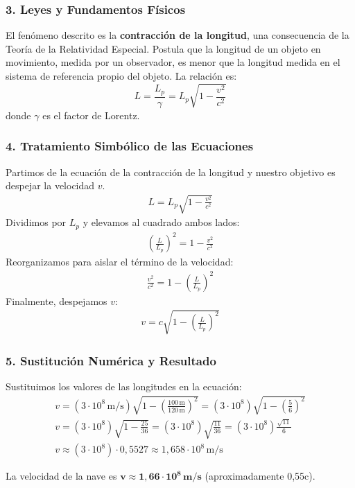 \subsubsection*{3. Leyes y Fundamentos Físicos}
El fenómeno descrito es la \textbf{contracción de la longitud}, una consecuencia de la Teoría de la Relatividad Especial. Postula que la longitud de un objeto en movimiento, medida por un observador, es menor que la longitud medida en el sistema de referencia propio del objeto. La relación es:
$$ L = \frac{L_p}{\gamma} = L_p \sqrt{1 - \frac{v^2}{c^2}} $$
donde $\gamma$ es el factor de Lorentz.

\subsubsection*{4. Tratamiento Simbólico de las Ecuaciones}
Partimos de la ecuación de la contracción de la longitud y nuestro objetivo es despejar la velocidad $v$.
\begin{gather}
    L = L_p \sqrt{1 - \frac{v^2}{c^2}}
\end{gather}
Dividimos por $L_p$ y elevamos al cuadrado ambos lados:
\begin{gather}
    \left(\frac{L}{L_p}\right)^2 = 1 - \frac{v^2}{c^2}
\end{gather}
Reorganizamos para aislar el término de la velocidad:
\begin{gather}
    \frac{v^2}{c^2} = 1 - \left(\frac{L}{L_p}\right)^2
\end{gather}
Finalmente, despejamos $v$:
\begin{gather}
    v = c \sqrt{1 - \left(\frac{L}{L_p}\right)^2}
\end{gather}

\subsubsection*{5. Sustitución Numérica y Resultado}
Sustituimos los valores de las longitudes en la ecuación:
\begin{gather}
    v = (3 \cdot 10^8 \, \text{m/s}) \sqrt{1 - \left(\frac{100 \, \text{m}}{120 \, \text{m}}\right)^2} = (3 \cdot 10^8) \sqrt{1 - \left(\frac{5}{6}\right)^2} \nonumber \\
    v = (3 \cdot 10^8) \sqrt{1 - \frac{25}{36}} = (3 \cdot 10^8) \sqrt{\frac{11}{36}} = (3 \cdot 10^8) \frac{\sqrt{11}}{6} \nonumber \\
    v \approx (3 \cdot 10^8) \cdot 0,5527 \approx 1,658 \cdot 10^8 \, \text{m/s}
\end{gather}
\begin{cajaresultado}
    La velocidad de la nave es $\boldsymbol{v \approx 1,66 \cdot 10^8 \, \textbf{m/s}}$ (aproximadamente 0,55c).
\end{cajaresultado}

